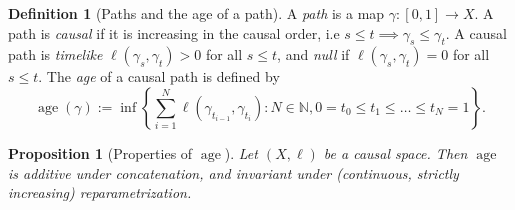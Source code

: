 \documentclass{article}
\newcommand{\N}{\mathbb{N}}
\DeclareMathOperator{\age}{age}
\newtheorem{prop}[theorem]{Proposition}
\theoremstyle{definition}
\newtheorem{defn}{Definition}[section]
\begin{document}
\begin{defn}[Paths and the age of a path]
A {\it path} is a map $\gamma:[0,1]\to X$. A path is {\it causal} if it is increasing in the causal order, i.e $s\leq t\implies \gamma_s\leq \gamma_t$. A causal path is {\it timelike} $\ell(\gamma_s,\gamma_t)>0$ for all $s\leq t$, and {\it null} if $\ell(\gamma_s,\gamma_t)=0$ for all $s\leq t$. The {\it age} of a causal path is defined by 
\[\age(\gamma):= \inf\left\{\sum_{i=1}^N\ell(\gamma_{t_{i-1}},\gamma_{t_i}): N\in \N, 0=t_0\leq t_1\leq\dots\leq t_N=1\right\}.\]
\end{defn}
\begin{prop}[Properties of $\age$]
Let $(X,\ell)$ be a causal space. Then $\age$ is additive under concatenation, and invariant under (continuous, strictly increasing) reparametrization. 
\end{prop}
\end{document}
